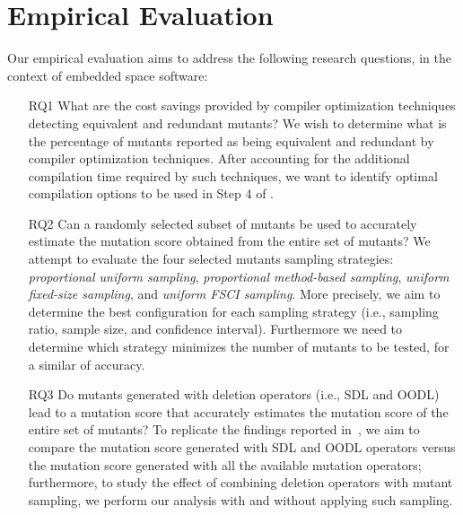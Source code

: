 


\section{Empirical Evaluation}
\label{sec:evaluation}

\STARTCHANGEDNOV

Our empirical evaluation aims to address the following research questions, in the context of embedded space software:

\begin{itemize}

    \item[RQ1] What are the cost savings provided by compiler optimization techniques detecting equivalent and redundant mutants?
    We wish to determine what is the percentage of mutants reported as being equivalent and redundant by compiler optimization techniques. After accounting for the additional compilation time required by such techniques, we want to identify optimal compilation options to be used in Step 4 of \APPR.

    \item[RQ2] Can a randomly selected subset of mutants be used to accurately estimate the mutation score obtained from the entire set of mutants? 
     {We attempt to evaluate the four selected mutants sampling strategies: \emph{proportional uniform sampling}, \emph{proportional method-based sampling},  \emph{uniform fixed-size sampling}, and \emph{uniform FSCI sampling}. More precisely, we aim to determine the best configuration for each sampling strategy (i.e., sampling ratio, sample size, and confidence interval). Furthermore we need to determine which strategy minimizes the number of mutants to be tested, for a similar of accuracy.}



    \item[RQ3]  {Do mutants generated with deletion operators (i.e., SDL and OODL) lead to a mutation score that accurately estimates the mutation score of the entire set of mutants?  
    To replicate the findings reported in~\cite{delamaro2014experimental},
    we aim to compare the mutation score generated with SDL and OODL operators versus the mutation score generated with all the available mutation operators; furthermore, to study the effect of combining deletion operators with mutant sampling,
    we perform our analysis with and without applying such sampling.}
    

\end{itemize}
